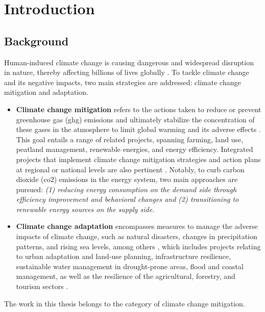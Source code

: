 \chapter{Introduction}


\section{Background}
Human-induced climate change is causing dangerous and widespread disruption in nature, thereby affecting billions of lives globally \cite{ipcc}. 
To tackle climate change and its negative impacts, two main strategies are addressed: climate change mitigation and adaptation.

\begin{itemize}
  \item \textbf{Climate change mitigation} refers to the actions taken to reduce or prevent greenhouse gas (\gls{ghg}) emissions and ultimately stabilize the concentration of these gases in the atmosphere to limit global warming and its adverse effects \cite{handbook}.
  This goal entails a range of related projects, spanning farming, land use, peatland management, renewable energies, and energy efficiency. Integrated projects that implement climate change mitigation strategies and action plans at regional or national levels are also pertinent \cite{ec}.
  Notably, to curb carbon dioxide (\gls{co2}) emissions in the energy system, two main approaches are pursued:
\emph{
  (1) reducing energy consumption on the demand side through efficiency improvement and behavioral changes and
  (2) transitioning to renewable energy sources on the supply side.
}
  \item \textbf{Climate change adaptation} encompasses measures to manage the adverse impacts of climate change, such as natural disasters, changes in precipitation patterns, and rising sea levels, among others \cite{handbook},
  which includes projects relating to urban adaptation and land-use planning, infrastructure resilience, sustainable water management in drought-prone areas, flood and coastal management, as well as the resilience of the agricultural, forestry, and tourism sectors \cite{ec}.  
\end{itemize}

The work in this thesis belongs to the category of climate change mitigation. 



